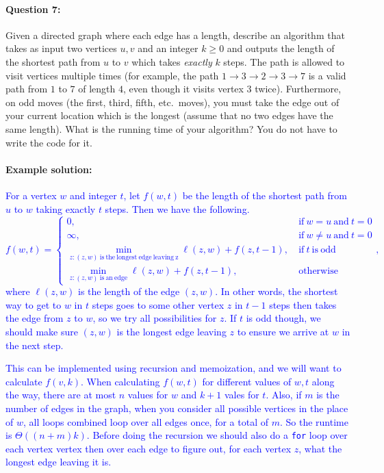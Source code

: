 \documentclass[11pt]{article}
\newcommand{\sol}[1]{\textcolor{blue}{#1}}
\begin{document}
\newpage

\paragraph{Question 7:}  
Given a directed graph where each edge has a
length, describe an algorithm that takes as input two vertices $u,v$
and an integer $k\ge 0$ and outputs the length of the shortest path
from $u$ to $v$ which takes {\em exactly} $k$ steps.  The path is
allowed to visit vertices multiple times (for example, the path
$1\rightarrow 3\rightarrow 2\rightarrow 3\rightarrow 7$ is a valid
path from $1$ to $7$ of length $4$, even though it visits vertex $3$
twice).  
Furthermore, on odd moves (the first, third, fifth, etc.\ moves), you
must take the edge out of your current location which is the longest
(assume that no two edges have the same length).
What is the running time of your algorithm?  You do not have
to write the code for it.

\paragraph{Example solution:}
\sol{
For a vertex $w$ and integer $t$, let $f(w,t)$ be the length of the
shortest path from $u$ to $w$ taking exactly $t$ steps. Then we have
the following.
$$
f(w, t) = \begin{cases} 0, \ &
  \mathrm{if}\ w=u\ \mathrm{and}\ t=0
\\ \infty, \ & \mathrm{if}\ w\neq u\ \mathrm{and}\ t=0
\\ \min_{z: (z,w)\ \mathrm{is\ the\ longest\ edge\ leaving\ z}}
\ell(z,w) + f(z,t-1),\ & \mathrm{if}\ t\ \mathrm{is\ odd}
\\ \min_{z: (z,w)\ \mathrm{is\ an\ edge}} \ell(z,w) + f(z,t-1), \ &
\mathrm{otherwise}
\end{cases} ,
$$
where $\ell(z,w)$ is the length of the edge $(z,w)$.  In other words,
the shortest way to get to $w$ in $t$ steps goes to some other vertex
$z$ in $t-1$ steps then takes the edge from $z$ to $w$, so we try all
possibilities for $z$. If $t$ is odd though, we should make sure
$(z,w)$ is the longest edge leaving $z$ to ensure we arrive at $w$ in
the next step.}

\sol{
This can be implemented using recursion and
memoization, and we will want to calculate $f(v, k)$.  When
calculating $f(w,t)$ for different values of $w,t$ along the way,
there are at most $n$ values for $w$ and $k+1$ vales for $t$.  Also,
if $m$ is the number of edges in the graph, when you consider all
possible vertices in the place of $w$, all loops combined loop over
all edges once, for a total of $m$.  So the runtime is
$\Theta((n+m)k)$.  
Before doing the recursion we should also do a \texttt{for} loop over
each vertex vertex then over each edge to figure out, for each vertex
$z$, what the longest edge leaving it is.}
\end{document}
